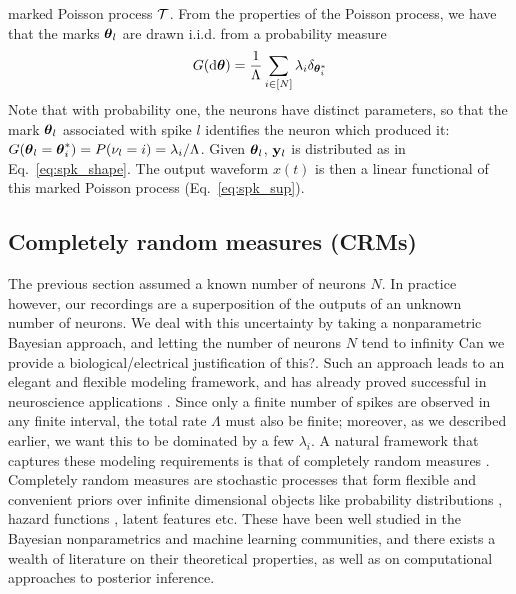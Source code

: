 marked Poisson process $\mathcal{T}$.  From the properties of the Poisson process, we have that the marks $\boldsymbol{\theta}_l$ are drawn i.i.d. from a probability measure 
\begin{align}
 G(\mathrm{d} \boldsymbol{\theta}) = \frac{1}{\Lambda}\sum_{i \in [N]} \lambda_i \delta_{\boldsymbol{\theta}^*_i}    \label{eq:mark_distr}
\end{align}
Note that with probability one, the neurons have distinct parameters, so that the mark $\boldsymbol{\theta}_l$ associated with spike $l$ identifies the
neuron which produced it: $G(\boldsymbol{\theta}_l = \boldsymbol{\theta}^*_i) = P(\nu_l= i) = \lambda_i/\Lambda$. Given $\boldsymbol{\theta}_l$, $\mathbf{y}_l$ is distributed as in
Eq.~\eqref{eq:spk_shape}. The output waveform $x(t)$ is then a linear functional of this marked Poisson process (Eq.~\eqref{eq:spk_sup}). 

\subsection{Completely random measures (CRMs)}

The previous section assumed a known number of neurons $N$. In practice however, our recordings are a superposition of the outputs of an unknown
number of neurons. We deal with this uncertainty by taking a nonparametric Bayesian approach, and letting the number of neurons $N$ tend to infinity
{\color{red} Can we provide a biological/electrical justification of this?}. 
Such an approach leads to an elegant and flexible modeling framework, and has  already proved successful in neuroscience applications
\citep{WoodBla2008}.
Since only a finite number of spikes are observed in any finite interval, the total rate $\Lambda$ must 
also be finite; moreover, as we described earlier, we want this to be dominated by a few $\lambda_i$. 
A natural framework that captures these  modeling requirements is that of completely random measures \citep{Kingman:PJM67}.
Completely random measures are stochastic processes that form flexible and convenient priors over
infinite dimensional objects like probability distributions \citep{JamesLP09}, hazard functions \citep{Hjo1990}, latent features \citep{ThiJor2007} etc. 
These have been well studied in the Bayesian nonparametrics and machine learning communities, and there exists a wealth of literature on
their theoretical properties, as well as on computational approaches to posterior inference.


